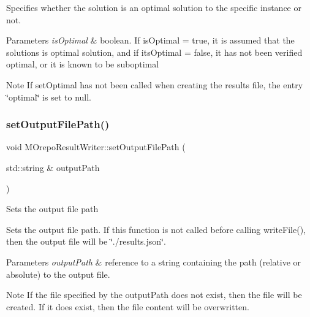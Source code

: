 Specifies whether the solution is an optimal solution to the specific instance or not. 
\begin{DoxyParams}{Parameters}
{\em is\+Optimal} & boolean. If is\+Optimal = true, it is assumed that the solutions is optimal solution, and if its\+Optimal = false, it has not been verified optimal, or it is known to be suboptimal \\
\hline
\end{DoxyParams}
\begin{DoxyNote}{Note}
If set\+Optimal has not been called when creating the results file, the entry \char`\"{}optimal\char`\"{} is set to null. 
\end{DoxyNote}
\mbox{\label{class_m_orepo_result_writer_a9ceed0e69181fb4352084c53d233743c}} 
\subsubsection{\texorpdfstring{set\+Output\+File\+Path()}{setOutputFilePath()}}
{\footnotesize\ttfamily void M\+Orepo\+Result\+Writer\+::set\+Output\+File\+Path (\begin{DoxyParamCaption}\item[{std\+::string \&}]{output\+Path }\end{DoxyParamCaption})\hspace{0.3cm}{\ttfamily [inline]}}

Sets the output file path

Sets the output file path. If this function is not called before calling write\+File(), then the output file will be \char`\"{}./results.\+json\char`\"{}. 
\begin{DoxyParams}{Parameters}
{\em output\+Path} & reference to a string containing the path (relative or absolute) to the output file. \\
\hline
\end{DoxyParams}
\begin{DoxyNote}{Note}
If the file specified by the output\+Path does not exist, then the file will be created. If it does exist, then the file content will be overwritten. 
\end{DoxyNote}
\mbox{\label{class_m_orepo_result_writer_aca99e0483a9af6c31557f678917b5ee3}} 
